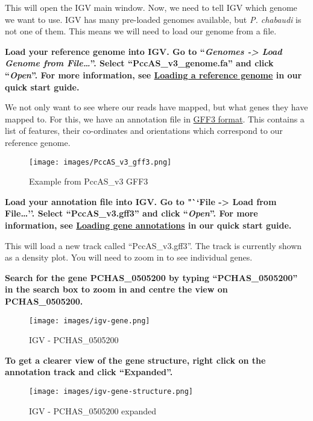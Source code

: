 \documentclass[11pt]{article}
\begin{document}
    This will open the IGV main window. Now, we need to tell IGV which
genome we want to use. IGV has many pre-loaded genomes available, but
\textit{P. chabaudi} is not one of them. This means we will need to load
our genome from a file.

\textbf{Load your reference genome into IGV. Go to ``\textit{Genomes
-\textgreater{} Load Genome from File\ldots{}}''. Select
``PccAS\_v3\_genome.fa'' and click ``\textit{Open}''. For more
information, see
\href{https://github.com/sanger-pathogens/pathogen-informatics-training/blob/master/Notebooks/IGV/index.ipynb}{Loading
a reference genome} in our quick start guide.}

\newpage


We not only want to see where our reads have mapped, but what genes they
have mapped to. For this, we have an annotation file in
\href{https://www.ensembl.org/info/website/upload/gff3.html}{GFF3
format}. This contains a list of features, their co-ordinates and
orientations which correspond to our reference genome.

    \begin{figure}[!h]
\centering
\texttt{[image: images/PccAS\_v3\_gff3.png]}
\caption{Example from PccAS\_v3 GFF3}
\end{figure}

    \textbf{Load your annotation file into IGV. Go to "``File
-\textgreater{} Load from File\ldots{}''. Select ``PccAS\_v3.gff3'' and
click ``\textit{Open}''. For more information, see
\href{https://github.com/sanger-pathogens/pathogen-informatics-training/blob/master/Notebooks/IGV/index.ipynb}{Loading
gene annotations} in our quick start guide.}

This will load a new track called ``PccAS\_v3.gff3''. The track is
currently shown as a density plot. You will need to zoom in to see
individual genes.


\textbf{Search for the gene PCHAS\_0505200 by typing ``PCHAS\_0505200''
in the search box to zoom in and centre the view on PCHAS\_0505200.}

    \begin{figure}[!h]
\centering
\texttt{[image: images/igv-gene.png]}
\caption{IGV - PCHAS\_0505200}
\end{figure}

    \textbf{To get a clearer view of the gene structure, right click on the
annotation track and click ``Expanded''.}

    \begin{figure}[!h]
\centering
\texttt{[image: images/igv-gene-structure.png]}
\caption{IGV - PCHAS\_0505200 expanded}
\end{figure}
\end{document}

